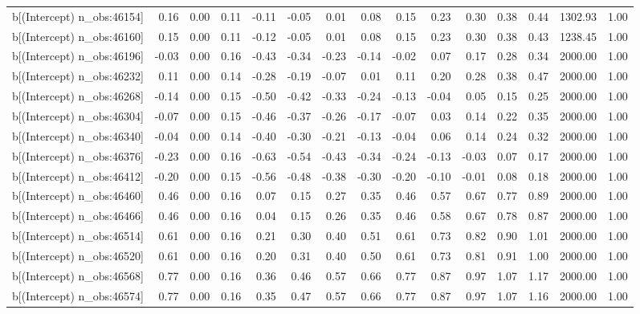 \begin{table}[ht]
\begin{tabular}{rrrrrrrrrrrrrrr}
  b[(Intercept) n\_obs:46154] & 0.16 & 0.00 & 0.11 & -0.11 & -0.05 & 0.01 & 0.08 & 0.15 & 0.23 & 0.30 & 0.38 & 0.44 & 1302.93 & 1.00 \\ 
  b[(Intercept) n\_obs:46160] & 0.15 & 0.00 & 0.11 & -0.12 & -0.05 & 0.01 & 0.08 & 0.15 & 0.23 & 0.30 & 0.38 & 0.43 & 1238.45 & 1.00 \\ 
  b[(Intercept) n\_obs:46196] & -0.03 & 0.00 & 0.16 & -0.43 & -0.34 & -0.23 & -0.14 & -0.02 & 0.07 & 0.17 & 0.28 & 0.34 & 2000.00 & 1.00 \\ 
  b[(Intercept) n\_obs:46232] & 0.11 & 0.00 & 0.14 & -0.28 & -0.19 & -0.07 & 0.01 & 0.11 & 0.20 & 0.28 & 0.38 & 0.47 & 2000.00 & 1.00 \\ 
  b[(Intercept) n\_obs:46268] & -0.14 & 0.00 & 0.15 & -0.50 & -0.42 & -0.33 & -0.24 & -0.13 & -0.04 & 0.05 & 0.15 & 0.25 & 2000.00 & 1.00 \\ 
  b[(Intercept) n\_obs:46304] & -0.07 & 0.00 & 0.15 & -0.46 & -0.37 & -0.26 & -0.17 & -0.07 & 0.03 & 0.14 & 0.22 & 0.35 & 2000.00 & 1.00 \\ 
  b[(Intercept) n\_obs:46340] & -0.04 & 0.00 & 0.14 & -0.40 & -0.30 & -0.21 & -0.13 & -0.04 & 0.06 & 0.14 & 0.24 & 0.32 & 2000.00 & 1.00 \\ 
  b[(Intercept) n\_obs:46376] & -0.23 & 0.00 & 0.16 & -0.63 & -0.54 & -0.43 & -0.34 & -0.24 & -0.13 & -0.03 & 0.07 & 0.17 & 2000.00 & 1.00 \\ 
  b[(Intercept) n\_obs:46412] & -0.20 & 0.00 & 0.15 & -0.56 & -0.48 & -0.38 & -0.30 & -0.20 & -0.10 & -0.01 & 0.08 & 0.18 & 2000.00 & 1.00 \\ 
  b[(Intercept) n\_obs:46460] & 0.46 & 0.00 & 0.16 & 0.07 & 0.15 & 0.27 & 0.35 & 0.46 & 0.57 & 0.67 & 0.77 & 0.89 & 2000.00 & 1.00 \\ 
  b[(Intercept) n\_obs:46466] & 0.46 & 0.00 & 0.16 & 0.04 & 0.15 & 0.26 & 0.35 & 0.46 & 0.58 & 0.67 & 0.78 & 0.87 & 2000.00 & 1.00 \\ 
  b[(Intercept) n\_obs:46514] & 0.61 & 0.00 & 0.16 & 0.21 & 0.30 & 0.40 & 0.51 & 0.61 & 0.73 & 0.82 & 0.90 & 1.01 & 2000.00 & 1.00 \\ 
  b[(Intercept) n\_obs:46520] & 0.61 & 0.00 & 0.16 & 0.20 & 0.31 & 0.40 & 0.50 & 0.61 & 0.73 & 0.81 & 0.91 & 1.00 & 2000.00 & 1.00 \\ 
  b[(Intercept) n\_obs:46568] & 0.77 & 0.00 & 0.16 & 0.36 & 0.46 & 0.57 & 0.66 & 0.77 & 0.87 & 0.97 & 1.07 & 1.17 & 2000.00 & 1.00 \\ 
  b[(Intercept) n\_obs:46574] & 0.77 & 0.00 & 0.16 & 0.35 & 0.47 & 0.57 & 0.66 & 0.77 & 0.87 & 0.97 & 1.07 & 1.16 & 2000.00 & 1.00 \\ 

\end{tabular}
\end{table}
